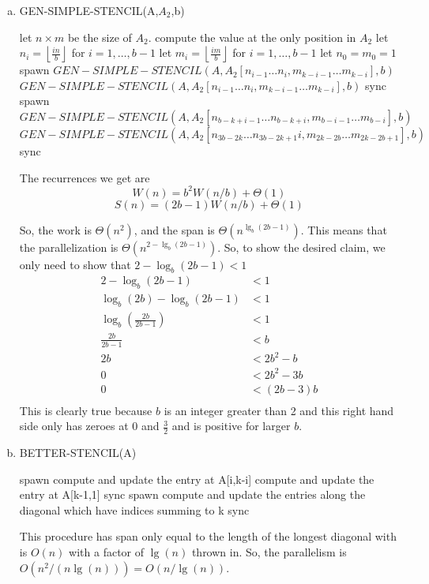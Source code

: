 \documentclass{article}
\begin{document}
\begin{enumerate}[a.]
\item
\begin{algorithm}
\caption{GEN-SIMPLE-STENCIL(A,$A_2$,b)}
\begin{algorithmic}
\State let $n\times m$ be the size of $A_2$.
\State compute the value at the only position in $A_2$
\Else
\State let $n_i = \left\lfloor \frac{in}{b}\right\rfloor$ for $i=1,\ldots, b-1$ 
\State let $m_i = \left\lfloor \frac{im}{b}\right\rfloor$ for $i=1,\ldots, b-1$
\State let $n_0 = m_0 = 1$
\State spawn $GEN-SIMPLE-STENCIL(A,A_2[n_{i-1}\ldots n_i,m_{k-i-1}\ldots m_{k-i}],b)$
\EndFor
\State $GEN-SIMPLE-STENCIL(A,A_2[n_{i-1}\ldots n_i,m_{k-i-1}\ldots m_{k-i}],b)$
\State sync
\EndFor
{}
\State spawn $GEN-SIMPLE-STENCIL(A,A_2[n_{b-k+i-1}\ldots n_{b-k+i},m_{b-i-1}\ldots m_{b-i}],b)$
\EndFor
\State $GEN-SIMPLE-STENCIL(A,A_2[n_{3b-2k}\ldots n_{3b-2k+1}i,m_{2k-2b}\ldots m_{2k-2b+1}],b)$
\State sync
\EndFor
\EndIf
\EndIf
\end{algorithmic}
\end{algorithm}

The recurrences we get are
\[
W(n) = b^2 W(n/b) + \Theta(1)
\]
\[
S(n) = (2b-1)W(n/b)+\Theta(1)
\]

So, the work is $\Theta(n^2)$, and the span is $\Theta(n^{\lg_b(2b-1)})$. This means that the parallelization is $\Theta(n^{2- \lg_b(2b-1)})$. So, to show the desired claim, we only need to show that $2-\log_b(2b-1)<1$
\begin{align*}
2-\log_b(2b-1)&<1\\
\log_b(2b)-\log_b(2b-1)&<1\\
\log_b\left(\frac{2b}{2b-1}\right)&<1\\
\frac{2b}{2b-1}&<b\\
2b&<2b^2 -b\\
0&<2b^2 -3b\\
0&<(2b -3)b\\
\end{align*}
This is clearly true because $b$ is an integer greater than 2 and this right hand side only has zeroes at 0 and $\frac{3}{2}$ and is positive for larger $b$.

\item
\begin{algorithm}
\caption{BETTER-STENCIL(A)}
\begin{algorithmic}
\State spawn compute and update the entry at A[i,k-i]
\EndFor
\State compute and update the entry at A[k-1,1]
\State sync
\EndFor
{}
\State spawn compute and update the entries along the diagonal which have indices summing to k
\EndFor
\State sync
\EndFor
\end{algorithmic}
\end{algorithm}

This procedure has span only equal to the length of the longest diagonal with is $O(n)$ with a factor of $\lg(n)$ thrown in. So, the parallelism is $O(n^2/(n\lg(n))) = O(n/\lg(n))$.
\end{enumerate}
\end{document}
